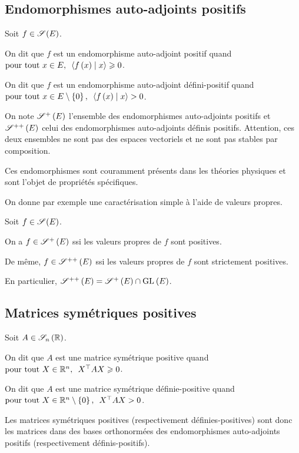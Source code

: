 \subsection{Endomorphismes auto-adjoints positifs}

\begin{defi}
Soit \(f\in\sym{}[E]\).

On dit que \(f\) est un endomorphisme auto-adjoint positif quand \(\quantifs{\tpt x\in E}\ps{f\paren{x}}{x}\geq0\).

On dit que \(f\) est un endomorphisme auto-adjoint défini-positif quand \(\quantifs{\tpt x\in E\excluant\accol{0}}\ps{f\paren{x}}{x}>0\).
\end{defi}

On note \(\sympos{}[E]\) l'ensemble des endomorphismes auto-adjoints positifs et \(\symdefpos{}[E]\) celui des endomorphismes auto-adjoints définis positifs. Attention, ces deux ensembles ne sont pas des espaces vectoriels et ne sont pas stables par composition.

Ces endomorphismes sont couramment présents dans les théories physiques et sont l'objet de propriétés spécifiques.

On donne par exemple une caractérisation simple à l'aide de valeurs propres.

\begin{prop}
Soit \(f\in\sym{}[E]\).

On a \(f\in\sympos{}[E]\) ssi les valeurs propres de \(f\) sont positives.

De même, \(f\in\symdefpos{}[E]\) ssi les valeurs propres de \(f\) sont strictement positives.
\end{prop}

En particulier, \(\symdefpos{}[E]=\sympos{}[E]\inter\GL{}[E]\).

\subsection{Matrices symétriques positives}

\begin{defi}
Soit \(A\in\sym{n}[\R]\).

On dit que \(A\) est une matrice symétrique positive quand \(\quantifs{\tpt X\in\R^n}\trans{X}AX\geq0\).

On dit que \(A\) est une matrice symétrique définie-positive quand \(\quantifs{\tpt X\in\R^n\excluant\accol{0}}\trans{X}AX>0\).
\end{defi}

Les matrices symétriques positives (respectivement définies-positives) sont donc les matrices dans des bases orthonormées des endomorphismes auto-adjoints positifs (respectivement définis-positifs).

